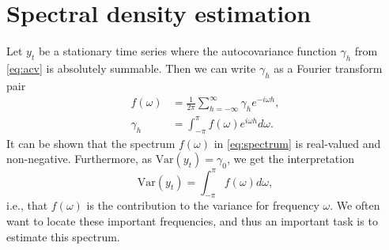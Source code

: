 \documentclass[a4paper, 10pt]{memoir}
\theoremstyle{plain}
\theoremstyle{definition}
\theoremstyle{remark}
\begin{document}
\section{Spectral density estimation}
Let $y_t$ be a stationary time series where the autocovariance function $\gamma_h$ from \eqref{eq:acv} is absolutely summable.
Then we can write $\gamma_h$ as a Fourier transform pair
\begin{align}\label{eq:spectrum}
        f(\omega) &= \frac{1}{2 \pi} \sum_{h = -\infty}^{\infty} \gamma_h e^{-i\omega h}, \\
        \label{eq:spectral_dens_inv}
        \gamma_h &= \int_{-\pi}^{\pi} f(\omega)e^{i\omega h}d\omega.
\end{align}
It can be shown \cite{shumway} that the spectrum $f(\omega)$ in \eqref{eq:spectrum} is real-valued and non-negative.
Furthermore, as $\text{Var}(y_t) = \gamma_0$, we get the interpretation
\begin{equation*}
        \text{Var}(y_t) = \int_{-\pi}^{\pi}f(\omega)d\omega,
\end{equation*}
i.e., that $f(\omega)$ is the contribution to the variance for frequency $\omega$.
We often want to locate these important frequencies,  and thus an important task is to estimate this spectrum.
\end{document}
